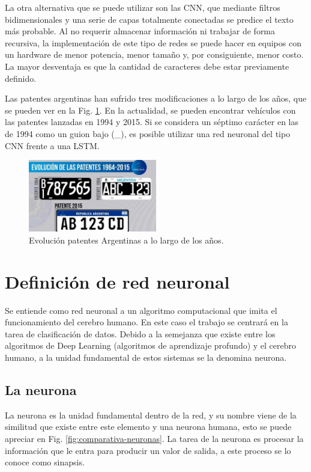 La otra alternativa que se puede utilizar son las CNN, que mediante filtros bidimensionales y una serie de capas totalmente conectadas se predice el texto más probable.
Al no requerir almacenar información ni trabajar de forma recursiva, la implementación
de este tipo de redes se puede hacer en equipos con un hardware de menor potencia, menor tamaño y, por consiguiente, menor costo. La mayor desventaja es que la cantidad de caracteres debe estar previamente definido.

Las patentes argentinas han sufrido tres modificaciones a lo largo de los años, que se pueden ver en la Fig. \ref{fig:patentes-arg}. En la actualidad, se pueden encontrar vehículos con las patentes lanzadas en 1994 y 2015. Si se considera un séptimo carácter en las de 1994 como un guion bajo (\_), es posible utilizar una red neuronal del tipo CNN frente a una LSTM.
\begin{figure}[bth]
    \centering
    \includegraphics[width=0.5\textwidth]{imgs/patentes-arg.png}
    \caption{Evolución patentes Argentinas a lo largo de los años.}
    \label{fig:patentes-arg}
\end{figure}


\section{Definición de red neuronal}

Se entiende como red neuronal a un algoritmo computacional que imita el funcionamiento del cerebro humano.
En este caso el trabajo se centrará en la tarea de clasificación de datos.
Debido a la semejanza que existe entre los algoritmos de Deep Learning \cite{ibm_que_nodate} (algoritmos de aprendizaje profundo) y el cerebro humano, a la unidad fundamental de estos sistemas se la denomina neurona.


\subsection{La neurona}

La neurona es la unidad fundamental dentro de la red, y su nombre viene de la similitud que existe entre este elemento y una neurona humana, esto se puede apreciar en Fig. \ref{fig:comparativa-neuronas}. La tarea de la neurona es procesar la información que le entra para producir un valor de salida, a este proceso se lo conoce como sinapsis.

